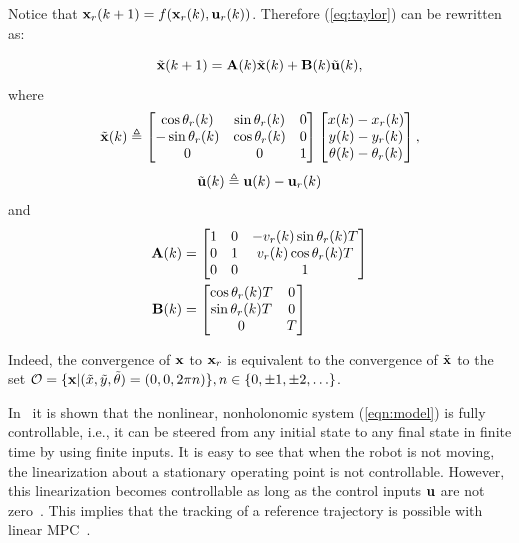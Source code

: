 \documentclass[conference]{IEEEtran} %
\begin{document}
Notice that ${\bf x}_r(k+1)=f({\bf x}_r(k),{\bf u}_r(k))$. Therefore
(\ref{eq:taylor}) can be rewritten as:

\begin{equation}\label{eqn:error}
	\tilde{\bf x}(k+1) = {\bf A}(k)\tilde{\bf x}(k)+{\bf B}(k)\tilde{\bf u}(k),
\end{equation}
\noindent where
\begin{equation*}
	\tilde{\bf x}(k) \triangleq \begin{bmatrix}
		\cos\theta_r(k)  & \sin\theta_r(k) & 0 \\
		-\sin\theta_r(k) & \cos\theta_r(k) & 0 \\
		0		       & 0		     & 1
	\end{bmatrix} 
	\begin{bmatrix}
		x(k)-x_r(k) \\ y(k)-y_r(k) \\ \theta(k)-\theta_r(k)
	\end{bmatrix},
\end{equation*}
$$
\tilde{\bf u}(k)\triangleq{\bf u}(k)-{\bf u}_r(k)
$$
\noindent and
\begin{align*}
	{\bf A}(k) &= \begin{bmatrix}
		1 & 0 & -v_r(k)\sin\theta_r(k)T \\
		0 & 1 &  v_r(k)\cos\theta_r(k)T \\
		0 & 0 & 1
	\end{bmatrix} \\
	{\bf B}(k) &= \begin{bmatrix}
		\cos\theta_r(k)T & 0 \\
		\sin\theta_r(k)T & 0 \\
		0 			  & T
	\end{bmatrix}
\end{align*}

Indeed, the convergence of ${\bf x}$ to ${\bf x}_r$ is equivalent to the
convergence of $\tilde{\bf x}$ to the set ${\cal O}=\{{\bf x}|(\tilde
x,\tilde y,\tilde\theta)=(0,0,2\pi n)\},n\in \{0,\pm1,\pm2,\ldots\}$.

In~\cite{bloch89} it is shown that the nonlinear, nonholonomic system
(\ref{eqn:model}) is fully controllable, i.e., it can be steered from any
initial state to any final state in finite time by using finite inputs. It
is easy to see that when the robot is not moving, the linearization about a
stationary operating point is not controllable. However, this linearization
becomes controllable as long as the control inputs ${\bf u}$ are not
zero~\cite{samson91}. This implies that the tracking of a reference
trajectory is possible with linear MPC~\cite{essen01}.
\end{document}

